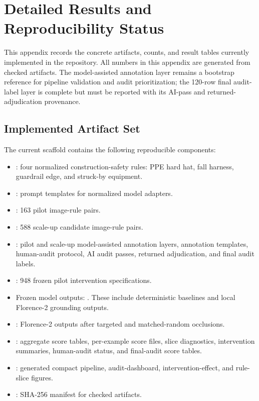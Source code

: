 \section{Detailed Results and Reproducibility Status}

This appendix records the concrete artifacts, counts, and result tables currently implemented in the repository. All numbers in this appendix are generated from checked artifacts. The model-assisted annotation layer remains a bootstrap reference for pipeline validation and audit prioritization; the 120-row final audit-label layer is complete but must be reported with its AI-pass and returned-adjudication provenance.

\subsection{Implemented Artifact Set}

The current scaffold contains the following reproducible components:

\begin{itemize}
\item {}: four normalized construction-safety rules: PPE hard hat, fall harness, guardrail edge, and struck-by equipment.
\item {}: prompt templates for normalized model adapters.
\item {}: 163 pilot image-rule pairs.
\item {}: 588 scale-up candidate image-rule pairs.
\item {}: pilot and scale-up model-assisted annotation layers, annotation templates, human-audit protocol, AI audit passes, returned adjudication, and final audit labels.
\item {}: 948 frozen pilot intervention specifications.
\item Frozen model outputs: . These include deterministic baselines and local Florence-2 grounding outputs.
\item {}: Florence-2 outputs after targeted and matched-random occlusions.
\item {}: aggregate score tables, per-example score files, slice diagnostics, intervention summaries, human-audit status, and final-audit score tables.
\item {}: generated compact pipeline, audit-dashboard, intervention-effect, and rule-slice figures.
\item {}: SHA-256 manifest for checked artifacts.
\end{itemize}

